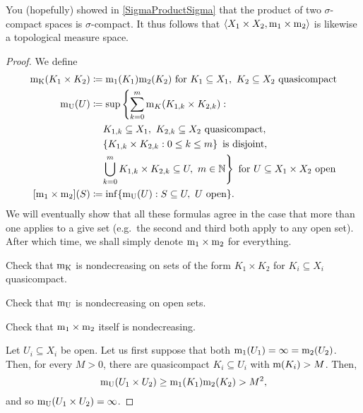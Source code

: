 \begin{thm}
\begin{rmk}
\end{rmk}
\begin{rmk}
You (hopefully) showed in \cref{SigmaProductSigma} that the product of two $\sigma$-compact spaces is $\sigma$-compact.  It thus follows that $\langle X_1\times X_2,\mathrm{m} _1\times \mathrm{m} _2\rangle$ is likewise a topological measure space.
\end{rmk}
\begin{proof}
We define
\begin{equation}
\begin{split}
\meas _{\mathrm{K}}(K_1\times K_2) & \coloneqq \meas _1(K_1)\meas _2(K_2)\text{ for }K_1\subseteq X_1,\ K_2\subseteq X_2\text{ quasicompact} \\
\meas _{\mathrm{U}}(U) & \coloneqq \sup \left\{ \sum _{k=0}^m\meas _K(K_{1,k}\times K_{2,k}):\right. \\
& \quad \left. K_{1,k}\subseteq X_1,\ K_{2,k}\subseteq X_2\text{ quasicompact},\right. \\
& \quad \left. \left\{ K_{1,k}\times K_{2,k}:0\leq k\leq m\right\} \text{ is disjoint},\right. \\
& \quad \left. \bigcup _{k=0}^mK_{1,k}\times K_{2,k}\subseteq U,\ m\in \N \right\} \text{ for }U\subseteq X_1\times X_2\text{ open} \\
[\meas _1\times \meas _2](S) & \coloneqq \inf \{ \meas _{\mathrm{U}}(U):S\subseteq U,\ U\text{ open}\} .
\end{split}
\end{equation}
We will eventually show that all these formulas agree in the case that more than one applies to a give set (e.g.~the second and third both apply to any open set).  After which time, we shall simply denote $\mathrm{m} _1\times \mathrm{m} _2$ for everything.

\begin{exr}
Check that $\mathrm{m} _{\mathrm{K}}$ is nondecreasing on sets of the form $K_1\times K_2$ for $K_i\subseteq X_i$ quasicompact.
\end{exr}
\begin{exr}
Check that $\mathrm{m} _{\mathrm{U}}$ is nondecreasing on open sets.
\end{exr}
\begin{exr}
Check that $\mathrm{m} _1\times \mathrm{m} _2$ itself is nondecreasing.
\end{exr}

Let $U_i\subseteq X_i$ be open.  Let us first suppose that both $\mathrm{m} _1(U_1)=\infty =\mathrm{m} _2(U_2)$.  Then, for every $M>0$, there are quasicompact $K_i\subseteq U_i$ with $\mathrm{m} (K_i)>M$.  Then,
\begin{equation}
\mathrm{m} _{\mathrm{U}}(U_1\times U_2)\geq \mathrm{m} _1(K_1)\mathrm{m} _2(K_2)>M^2,
\end{equation}
and so $\mathrm{m} _{\mathrm{U}}(U_1\times U_2)=\infty$.


\end{proof}
\end{thm}
